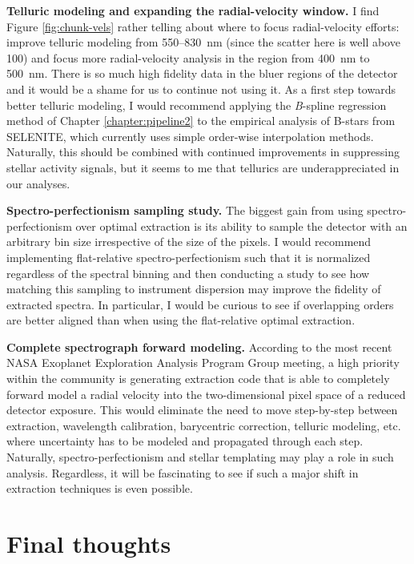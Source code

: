 \textbf{Telluric modeling and expanding the radial-velocity window.} I find Figure \ref{fig:chunk-vels} rather telling about where to focus radial-velocity efforts: improve telluric modeling from 550--830~\si{\nano\meter} (since the scatter here is well above 100\ms) and focus more radial-velocity analysis in the region from 400~\si{\nano\meter} to 500~\si{\nano\meter}. There is so much high fidelity data in the bluer regions of the detector and it would be a shame for us to continue not using it. As a first step towards better telluric modeling, I would recommend applying the \textit{B}-spline regression method of Chapter \ref{chapter:pipeline2} to the empirical analysis of B-stars from SELENITE, which currently uses simple order-wise interpolation methods. Naturally, this should be combined with continued improvements in suppressing stellar activity signals, but it seems to me that tellurics are underappreciated in our analyses.

\textbf{Spectro-perfectionism sampling study.} The biggest gain from using spectro-per\-fectionism over optimal extraction is its ability to sample the detector with an arbitrary bin size irrespective of the size of the pixels. I would recommend implementing flat-relative spectro-perfectionism such that it is normalized regardless of the spectral binning and then conducting a study to see how matching this sampling to instrument dispersion may improve the fidelity of extracted spectra. In particular, I would be curious to see if overlapping orders are better aligned than when using the flat-relative optimal extraction.

\textbf{Complete spectrograph forward modeling.} According to the most recent NASA Exo\-planet Exploration Analysis Program Group meeting, a high priority within the community is generating extraction code that is able to completely forward model a radial velocity into the two-dimensional pixel space of a reduced detector exposure. This would eliminate the need to move step-by-step between extraction, wavelength calibration, bary\-centric correction, telluric modeling, etc. where uncertainty has to be modeled and propagated through each step. Naturally, spectro-perfectionism and stellar templating may play a role in such analysis. Regardless, it will be fascinating to see if such a major shift in extraction techniques is even possible.

\section{Final thoughts} \label{conclusion:final}

